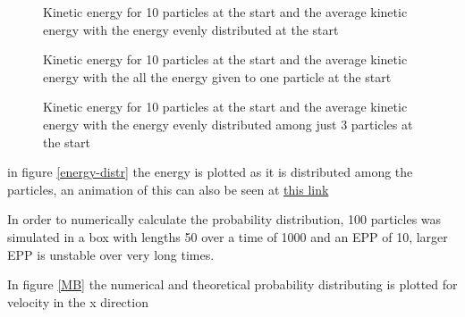 \documentclass[10pt,a4paper,aps,twocolumn,secnumarabic,numerical,balancelastpage,nofootinbib,superscriptaddress]{revtex4-2}
\begin{document}
		\begin{figure*}[htb]
			\centering
			\begin{subfigure}{.45\textwidth}
				\scalebox{0.6}{}
				\caption{Kinetic energy for 10 particles at the start and the average kinetic energy with the energy evenly distributed at the start}
			\end{subfigure}
			\begin{subfigure}{.45\textwidth}
				\scalebox{0.6}{}
				\caption{Kinetic energy for 10 particles at the start and the average kinetic energy with the all the energy given to one particle at the start}
			\end{subfigure}
			\begin{subfigure}{.45\textwidth}
				\scalebox{0.6}{}
				\caption{Kinetic energy for 10 particles at the start and the average kinetic energy with the energy evenly distributed among just 3 particles at the start}
			\end{subfigure}
			\caption{\label{energy-distr}Path of one particle with different values of time step $dt$}
		\end{figure*}
		in figure \ref{energy-distr} the energy is plotted as it is distributed among the particles, an animation of this can also be seen at \href{https://folk.ntnu.no/stiansjo/10_Particles_1_moving.gif}{this link} 
		
		In order to numerically calculate the probability distribution, 100 particles was simulated in a box with lengths 50 over a time of 1000 and an EPP of 10, larger EPP is unstable over very long times.
		\begin{figure*}
			\centering
			\scalebox{0.8}{}
			\caption{\label{MB}Probability distribution of velocity of one particle}
		\end{figure*}
		In figure \ref{MB} the numerical and theoretical probability distributing is plotted for velocity in the x direction
		
		
\end{document}
